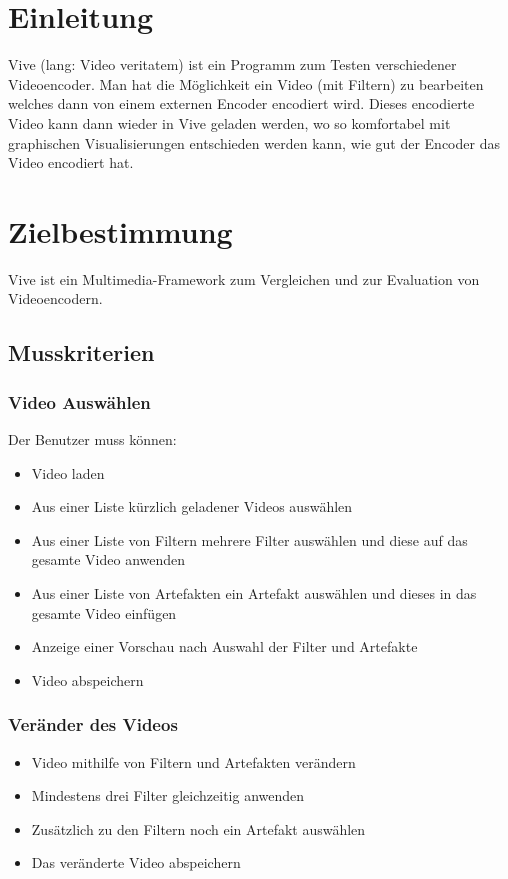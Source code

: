 \documentclass[parskip=full]{scrartcl}
\begin{document}
\maketitle
\thispagestyle{empty}
\newpage
\tableofcontents
\newpage
\section*{Einleitung}
Vive (lang: Video veritatem) ist ein Programm zum Testen verschiedener Videoencoder. Man hat die Möglichkeit ein Video (mit Filtern) zu bearbeiten welches dann von einem externen Encoder encodiert wird. Dieses encodierte Video kann dann wieder in Vive geladen werden, wo so komfortabel mit graphischen Visualisierungen entschieden werden kann, wie gut der Encoder das Video encodiert hat.
\section{Zielbestimmung}
Vive ist ein Multimedia-Framework zum Vergleichen und zur Evaluation von Videoencodern.
\subsection{Musskriterien}
\subsubsection{Video Auswählen}
Der Benutzer muss können:
\begin{itemize}
\item Video laden
\item Aus einer Liste kürzlich geladener Videos auswählen
\item Aus einer Liste von Filtern mehrere Filter auswählen und diese auf das gesamte Video anwenden
\item Aus einer Liste von Artefakten ein Artefakt auswählen und dieses in das gesamte Video einfügen
\item Anzeige einer Vorschau nach Auswahl der Filter und Artefakte
\item Video abspeichern
\end{itemize}
\subsubsection{Veränder des Videos}
\begin{itemize}
\item Video mithilfe von Filtern und Artefakten verändern
\item Mindestens drei Filter gleichzeitig anwenden
\item Zusätzlich zu den Filtern noch ein Artefakt auswählen
\item Das veränderte Video abspeichern
\end{itemize}
\end{document}
